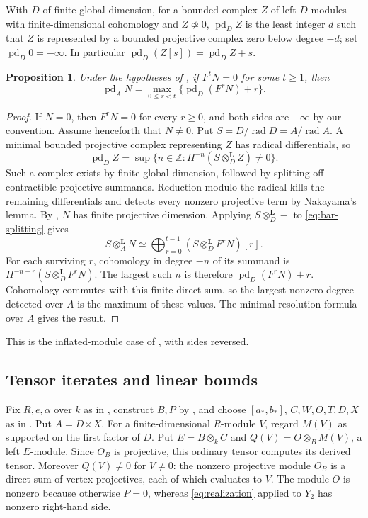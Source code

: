 \documentclass[11pt]{article}
\numberwithin{equation}{section}
\newtheorem{proposition}[theorem]{Proposition}
\theoremstyle{definition}
\theoremstyle{remark}
\newcommand{\Z}{\mathbb Z}
\newcommand{\otL}{\otimes^{\mathbf L}}
\DeclareMathOperator{\pd}{pd}
\DeclareMathOperator{\rad}{rad}
\begin{document}
With $D$ of finite global dimension, for a bounded complex $Z$
of left $D$-modules with finite-dimensional cohomology and $Z\not\simeq0$,
$\pd_D Z$ is the least integer $d$ such that $Z$ is represented by
a bounded projective complex zero below degree $-d$; set
$\pd_D0=-\infty$. In particular $\pd_D(Z[s])=\pd_D Z+s$.
\begin{proposition}\label{prop:exact-pd}
Under the hypotheses of , if $F^tN=0$ for
some $t\ge1$, then
\[
\pd_A N=\max_{0\le r<t}\{\pd_D(F^rN)+r\}.
\]
\end{proposition}
\begin{proof}
If $N=0$, then $F^rN=0$ for every $r\ge0$, and both sides are
$-\infty$ by our convention. Assume henceforth that $N\ne0$.
Put $S=D/\rad D=A/\rad A$. A minimal bounded projective complex
representing $Z$ has radical differentials, so
\[
\pd_D Z=\sup\{n\in\Z:H^{-n}(S\otL_D Z)\ne0\}.
\]
Such a complex exists by finite global dimension, followed by
splitting off contractible projective summands. Reduction modulo
the radical kills the remaining differentials and detects every
nonzero projective term by Nakayama's lemma.
By , $N$ has finite projective dimension.
Applying $S\otL_D-$ to \eqref{eq:bar-splitting} gives
\[
 S\otL_A N\simeq\bigoplus_{r=0}^{t-1}
 (S\otL_D F^rN)[r].
\]
For each surviving $r$, cohomology in degree $-n$ of its summand
is $H^{-n+r}(S\otL_D F^rN)$. The largest such $n$ is therefore
$\pd_D(F^rN)+r$. Cohomology commutes with this finite direct sum,
so the largest nonzero degree detected over $A$ is the maximum of
these values. The minimal-resolution formula over $A$ gives the result.
\end{proof}
This is the inflated-module case of
\cite[Corollary~4.11]{MinamotoYamaura}, with sides reversed.

\subsection{Tensor iterates and linear bounds}

Fix $R,e,\alpha$ over $k$ as in , construct $B,P$
by , and choose $[a_*,b_*]$, $C,W,O,T,D,X$
as in . Put $A=D\ltimes X$.
For a finite-dimensional $R$-module $V$, regard $M(V)$ as supported
on the first factor of $D$. Put $E=B\otimes_k C$ and
$Q(V)=O\otimes_B M(V)$, a left $E$-module. Since $O_B$ is
projective, this ordinary tensor computes its derived tensor.
Moreover $Q(V)\ne0$ for $V\ne0$: the nonzero projective module
$O_B$ is a direct sum of vertex projectives, each of which evaluates
to $V$. The module $O$ is nonzero because otherwise $P=0$, whereas
\eqref{eq:realization} applied to $Y_2$ has nonzero right-hand side.
\end{document}
